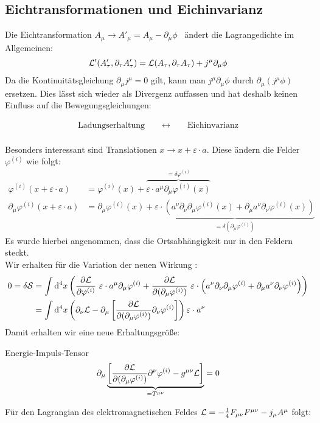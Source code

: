\subsection{Eichtransformationen und Eichinvarianz}
Die Eichtransformation $A_{\mu} \rightarrow A'_{\mu} = A_{\mu} - \partial_{\mu}\phi$ \ ändert die Lagrangedichte im Allgemeinen:
\begin{align}
\mathcal{L}'(A'_{\tau},\partial_{\tau}A'_{\tau}) = \mathcal{L}(A_{\tau},\partial_{\tau}A_{\tau})+ j^{\mu}\partial_{\mu}\phi
\end{align}
Da die Kontinuitätsgleichung $\partial_{\mu}j^{\mu}=0$ gilt, kann man $j^{\mu}\partial_{\mu}\phi$ durch $\partial_{\mu}(j^{\mu}\phi)$ ersetzen.
Dies lässt sich wieder als Divergenz auffassen und hat deshalb keinen Einfluss auf die Bewegungsgleichungen:

\begin{align*}
\text{Ladungserhaltung} \qquad \longleftrightarrow \qquad \text{Eichinvarianz}
\end{align*}
\\
Besonders interessant sind Translationen $x \rightarrow x + \varepsilon \cdot a$. Diese ändern die Felder $\varphi^{(i)}$ wie folgt:
\begin{align*}
\varphi^{(i)}(x + \varepsilon \cdot a) &= \varphi^{(i)}(x) + \overbrace{\varepsilon\cdot a^{\mu}\partial_{\mu}\varphi^{(i)}(x)}^{= \delta\varphi^{(i)}} \\
\partial_{\mu}\varphi^{(i)}(x + \varepsilon \cdot a) &= \partial_{\mu}\varphi^{(i)}(x) + \underbrace{\varepsilon\cdot\left(a^{\nu}\partial_{\nu}\partial_{\mu}\varphi^{(i)}(x) + \partial_{\mu}a^{\nu}\partial_{\nu}\varphi^{(i)}(x)\right)}_{ = \delta(\partial_{\mu}\varphi^{(i)})} 
\end{align*}
Es wurde hierbei angenommen, dass die Ortsabhängigkeit nur in den Feldern steckt. \\
Wir erhalten für die Variation der neuen Wirkung :
\begin{align*}
0 = \delta \mathcal{S} &= \int \dd[4]{x} \left( \dphi \ \varepsilon\cdot a^{\mu}\partial_{\mu}\varphi^{(i)} + \ddphi \ \varepsilon\cdot\left(a^{\nu}\partial_{\nu}\partial_{\mu}\varphi^{(i)}+\partial_{\mu}a^{\nu}\partial_{\nu}\varphi^{(i)}\right) \right) \\
&= \int \dd[4]{x} \left( \partial_{\nu}\lagr - \partial_{\mu} \left[\ddphi \partial_{\nu}\varphi^{(i)}\right] \right) \varepsilon\cdot a^{\nu}
\end{align*}
Damit erhalten wir eine neue Erhaltungsgröße:
\begin{mybox}{Energie-Impuls-Tensor}
\begin{align}
\partial_{\mu}\underbrace{\left[ \frac{\partial\mathcal{L}}{\partial(\partial_{\mu}\varphi^{(i)})} \partial^{\nu}\varphi^{(i)} - g^{\mu \nu}\mathcal{L} \right]}_{ = T^{\mu\nu}} = 0
\end{align}
\end{mybox}
\newpage
Für den Lagrangian des elektromagnetischen Feldes $\mathcal{L} = -\frac{1}{4} F_{\mu \nu} F^{\mu \nu} - j_{\mu}A^{\mu}$ folgt:

